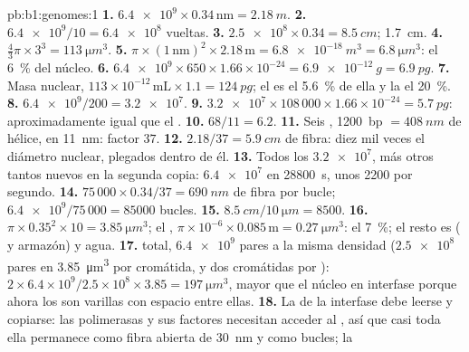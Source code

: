 \begin{solution}{pb:b1:genomes:1}
\textbf{1.} $\num{6.4e9}\times 0.34\,\mathrm{nm} = \qty{2.18}{m}$.
\textbf{2.} $\num{6.4e9}/10 = \num{6.4e8}$ vueltas.
\textbf{3.} $\num{2.5e8}\times 0.34 = \qty{8.5}{cm}$; \qty{1.7}{cm}.
\textbf{4.} $\frac{4}{3}\pi\times 3^3 = \qty{113}{\micro m^3}$.
\textbf{5.} $\pi\times(1\,\mathrm{nm})^2\times 2.18\,\mathrm{m} =
\qty{6.8e-18}{m^3} = \qty{6.8}{\micro m^3}$: el \qty{6}{\%} del núcleo.
\textbf{6.} $\num{6.4e9}\times 650\times 1.66\times 10^{-24} =
\qty{6.9e-12}{g} = \qty{6.9}{pg}$.
\textbf{7.} Masa nuclear, $113\times 10^{-12}\,\mathrm{mL}\times 1.1 =
\qty{124}{pg}$; el  es el \qty{5.6}{\%} de ella y la  el
\qty{20}{\%}.
\textbf{8.} $\num{6.4e9}/200 = \num{3.2e7}$.
\textbf{9.} $\num{3.2e7}\times 108\,000\times 1.66\times 10^{-24} =
\qty{5.7}{pg}$: aproximadamente igual que el .
\textbf{10.} $68/11 = 6.2$.
\textbf{11.} Seis , \qty{1200}{bp} $= \qty{408}{nm}$ de hélice,
en \qty{11}{nm}: factor $37$.
\textbf{12.} $2.18/37 = \qty{5.9}{cm}$ de fibra: diez mil veces el diámetro
nuclear, plegados dentro de él.
\textbf{13.} Todos los $\num{3.2e7}$, más otros tantos nuevos en la segunda
copia: $\num{6.4e7}$ en \qty{28800}{s}, unos \num{2200} por segundo.
\textbf{14.} $75\,000\times 0.34/37 = \qty{690}{nm}$ de fibra por bucle;
$\num{6.4e9}/75\,000 = \num{85000}$ bucles.
\textbf{15.} $\qty{8.5}{cm}/\qty{10}{\micro m} = 8500$.
\textbf{16.} $\pi\times 0.35^2\times 10 = \qty{3.85}{\micro m^3}$; el ,
$\pi\times 10^{-6}\times 0.085\,\mathrm{m} = \qty{0.27}{\micro m^3}$: el
\qty{7}{\%}; el resto es  ( y armazón) y agua.
\textbf{17.}  total, $\num{6.4e9}$ pares a la misma densidad
($\num{2.5e8}$ pares en \qty{3.85}{\micro m^3} por cromátida, y dos
cromátidas por ): $2\times 6.4\times 10^9/2.5\times 10^8\times
3.85 = \qty{197}{\micro m^3}$, mayor que el núcleo en interfase porque ahora
los  son varillas con espacio entre ellas.
\textbf{18.} La  de la interfase debe leerse y copiarse: las
polimerasas y sus factores necesitan acceder al , así que casi toda ella
permanece como fibra abierta de \qty{30}{nm} y como bucles; la 

\end{solution}
